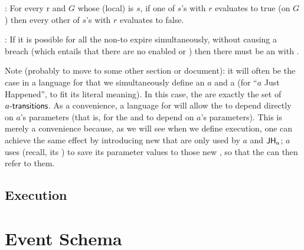 \documentclass[12pt]{article}
\begin{document}
\noindent {}: For every \Role r and \GlobalState $G$ whose (local) \State is $s$, if one of $s$'s \rmustntrans with \Role $r$ evaluates to true (on $G$) then every other of $s$'s \rmustntrans with \Role $r$ evaluates to false.
\medskip

\noindent {}: If it is possible for all the \enabled non-\Env \transitions to expire simultaneously, without causing a breach (which entails that there are no enabled \mustntrans or \rmustntrans) then there must be an \depTrans{\Env} with \Deadline \nodeadline.



\bigskip

Note (probably to move to some other section or document): it will often be the case in a language for \Contracts that we simultaneously define an \Action $a$ and a \State {} (for ``$a$ Just Happened'', to fit its literal meaning). In this case, the  are exactly the set of $a\textsf{-transitions}$. As a convenience, a language for \Contracts will allow the  to depend directly on $a$'s parameters (that is, for the \TGuard and \ESConstructor to depend on $a$'s parameters). This is merely a convenience because, as we will see when we define execution, one can achieve the same effect by introducing new \GVars that are only used by $a$ and $\textsf{JH}_{a}$; $a$ uses  (recall, its \gvTransform) to save its parameter values to those new \GVars, so that the  can then refer to them.

\subsection{Execution}

\section{Event Schema} \label{eventschema}

\end{document}
